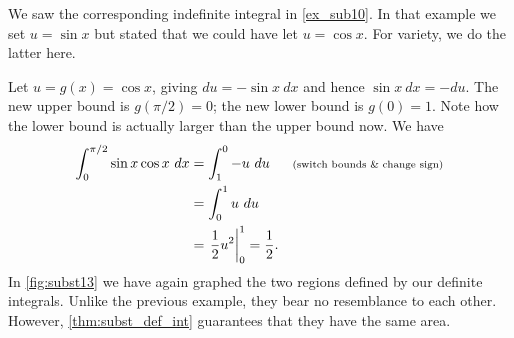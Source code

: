 {We saw the corresponding indefinite integral in \autoref{ex_sub10}. In that example we set $u = \sin x$ but stated that we could have let $u = \cos x$. For variety, we do the latter here.

Let $u = g(x) = \cos x$, giving $du = -\sin x\ dx$ and hence $\sin x\ dx = -du$. The new upper bound is $g(\pi/2) = 0$; the new lower bound is $g(0) = 1$. Note how the lower bound is actually larger than the upper bound now. We have
\begin{align*}
	\int_0^{\pi/2} \sin x\cos x\ dx
	&= \int_1^0 -u\ du && \text{\scriptsize (switch bounds \& change sign)}\\
	&= \int_0^1 u\ du\\
	&= \left.\frac12u^2\right|_0^1= \frac12.
\end{align*}
In \autoref{fig:subst13} we have again graphed the two regions defined by our definite integrals. Unlike the previous example, they bear no resemblance to each other. However, \autoref{thm:subst_def_int} guarantees that they have the same area.}




